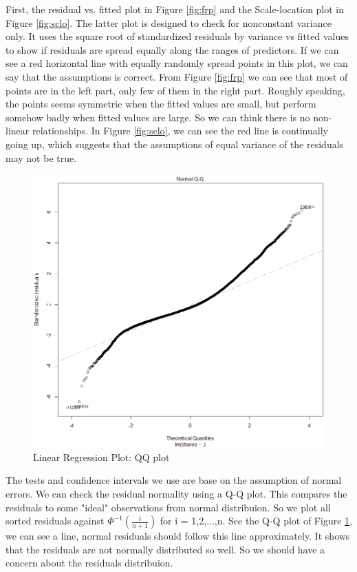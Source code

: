 \documentclass[12pt]{article}
\begin{document}
First, the residual vs. fitted plot in Figure \ref{fig:frp} and the Scale-location plot in Figure \ref{fig:sclo}. The latter plot is designed to check for nonconstant variance only. It uses the square root of standardized residuals by variance vs fitted values to show if residuals are spread equally along the ranges of predictors. If we can see a red horizontal line with equally randomly spread points in this plot, we can say that the assumptions is correct. From Figure \ref{fig:frp} we can see that most of points are in the left part, only few of them in the right part. Roughly speaking, the points seems symmetric when the fitted values are small, but perform somehow badly when fitted values are large. So we can think there is no non-linear relationships. In Figure \ref{fig:sclo}, we can see the red line is continually going up, which suggests that the assumptions of equal variance of the residuals may not be true. 

    \begin{figure}[h]
        \centering
        \includegraphics[width=0.7\linewidth]{linear_qq.png}
        \caption{Linear Regression Plot: QQ plot}
        \label{fig:qqp}
    \end{figure}    
    
    The tests and confidence intervals we use are base on the assumption of normal errors. We can check the residual normality using a Q-Q plot. This compares the residuals to some "ideal" observations from normal distribuion. So we plot all sorted residuals against $\Phi^{-1}(\frac{i}{n+1})$ for i = 1,2,...,n. See the Q-Q plot of Figure \ref{fig:qqp}, we can see a line, normal residuals should follow this line approximately. It shows that the residuals are not normally distributed so well. So we should have a concern about the residuals distribuion.\\
    
\end{document}
